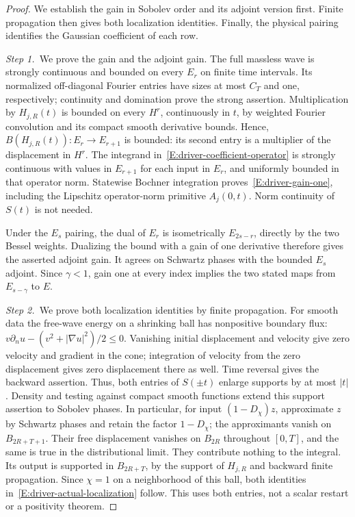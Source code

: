 \begin{proof}
  We establish the gain in Sobolev order and its adjoint version first. Finite
  propagation then gives both localization identities. Finally, the physical
  pairing identifies the Gaussian coefficient of each row.

  \medskip
  \noindent\textit{Step 1.~}We prove the gain and the adjoint gain.
  The full massless wave is strongly continuous and bounded on every $E_r$ on
  finite time intervals. Its normalized off-diagonal Fourier entries have sizes
  at most $C_T$ and one, respectively; continuity and domination prove the
  strong assertion. Multiplication by $H_{j,R}(t)$ is bounded on every $H^r$,
  continuously in $t$, by weighted Fourier convolution and its compact smooth
  derivative bounds. Hence, $B(H_{j,R}(t)):E_r \to E_{r+1}$ is bounded: its
  second entry is a multiplier of the displacement in $H^r$. The integrand
  in~\eqref{E:driver-coefficient-operator} is strongly continuous with values in
  $E_{r+1}$ for each input in $E_r$, and uniformly bounded in that operator
  norm. Statewise Bochner integration proves~\eqref{E:driver-gain-one},
  including the Lipschitz operator-norm primitive $A_j(0,t)$. Norm continuity of
  $S(t)$ is not needed.

  Under the $E_s$ pairing, the dual of $E_r$ is isometrically $E_{2s-r}$,
  directly by the two Bessel weights. Dualizing the bound with a gain of one
  derivative therefore gives the asserted adjoint gain. It agrees on Schwartz
  phases with the bounded $E_s$ adjoint. Since $\gamma < 1$, gain one at every
  index implies the two stated maps from $E_{s-\gamma}$ to $E$.


  \medskip
  \noindent\textit{Step 2.~}We prove both localization identities by finite
  propagation.
  For smooth data the free-wave energy on a shrinking ball has nonpositive
  boundary flux: $v\partial_nu-(v^2+|\nabla u|^2)/2 \le 0$. Vanishing initial
  displacement and velocity give zero velocity and gradient in the cone;
  integration of velocity from the zero displacement gives zero displacement
  there as well. Time reversal gives the backward assertion. Thus, both entries
  of $S(\pm t)$ enlarge supports by at most $|t|$. Density and testing against
  compact smooth functions extend this support assertion to Sobolev phases. In
  particular, for input $(1-D_\chi)z$, approximate $z$ by Schwartz phases and
  retain the factor $1-D_\chi$; the approximants vanish on $B_{2R+T+1}$. Their
  free displacement vanishes on $B_{2R}$ throughout $[0,T]$, and the same is
  true in the distributional limit. They contribute nothing to the integral. Its
  output is supported in $B_{2R+T}$, by the support of $H_{j,R}$ and backward
  finite propagation. Since $\chi = 1$ on a neighborhood of this ball, both
  identities in~\eqref{E:driver-actual-localization} follow. This uses both
  entries, not a scalar restart or a positivity theorem.


\end{proof}
